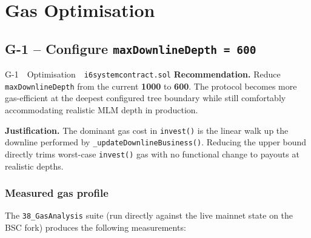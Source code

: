 \documentclass[11pt,a4paper]{article}
\begin{document}
\newpage

\section{Gas Optimisation}

\subsection{G-1 -- Configure \texttt{maxDownlineDepth = 600}}

\begin{optimizationbox}{G-1 \,\textbar\, Optimisation \,\textbar\, \texttt{i6systemcontract.sol}}
\textbf{Recommendation.} Reduce \texttt{maxDownlineDepth} from the current
\textbf{1000} to \textbf{600}. The protocol becomes more gas-efficient at the
deepest configured tree boundary while still comfortably accommodating
realistic MLM depth in production.

\textbf{Justification.} The dominant gas cost in \texttt{invest()} is the
linear walk up the downline performed by \texttt{\_updateDownlineBusiness()}.
Reducing the upper bound directly trims worst-case \texttt{invest()} gas with
no functional change to payouts at realistic depths.
\end{optimizationbox}

\subsubsection*{Measured gas profile}

The \texttt{38\_GasAnalysis} suite (run directly against the live mainnet state on the BSC fork) produces the following measurements:
\end{document}
